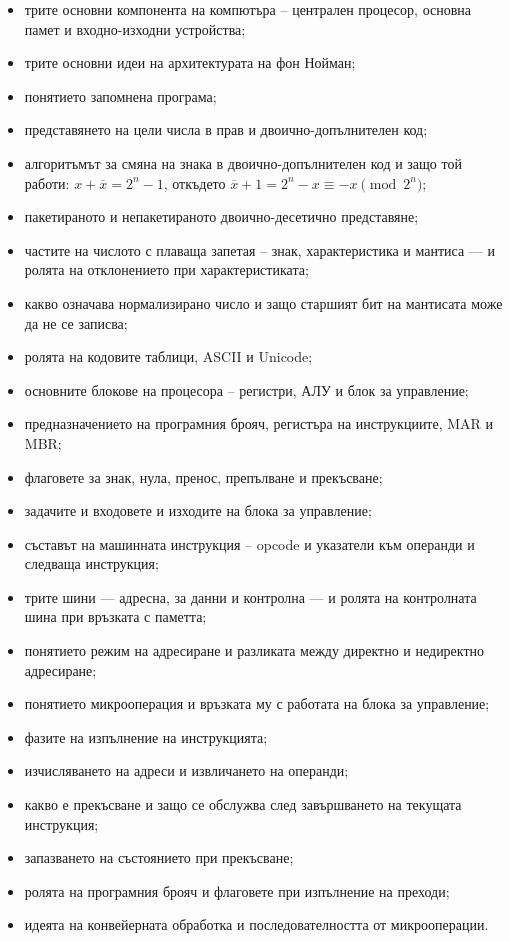 \begin{itemize}
    \item трите основни компонента на компютъра -- централен процесор, основна памет и входно-изходни устройства;
    \item трите основни идеи на архитектурата на фон Нойман;
    \item понятието запомнена програма;
    \item представянето на цели числа в прав и двоично-допълнителен код;
    \item алгоритъмът за смяна на знака в двоично-допълнителен код и защо той работи: $x+\overline{x}=2^n-1$, откъдето $\overline{x}+1=2^n-x\equiv-x \pmod{2^n}$;
    \item пакетираното и непакетираното двоично-десетично представяне;
    \item частите на числото с плаваща запетая -- знак, характеристика и мантиса --- и ролята на отклонението при характеристиката;

    \item какво означава нормализирано число и защо старшият бит на мантисата може да не се записва;
    \item ролята на кодовите таблици, ASCII и Unicode;
    \item основните блокове на процесора -- регистри, АЛУ и блок за управление;
    \item предназначението на програмния брояч, регистъра на инструкциите, MAR и MBR;
    \item флаговете за знак, нула, пренос, препълване и прекъсване;
    \item задачите и входовете и изходите на блока за управление;
    \item съставът на машинната инструкция -- opcode и указатели към операнди и следваща инструкция;
    \item трите шини --- адресна, за данни и контролна --- и ролята на контролната шина при връзката с паметта;

    \item понятието режим на адресиране и разликата между директно и недиректно адресиране;

    \item понятието микрооперация и връзката му с работата на блока за управление;
    \item фазите на изпълнение на инструкцията;
    \item изчисляването на адреси и извличането на операнди;
    \item какво е прекъсване и защо се обслужва след завършването на текущата инструкция;

    \item запазването на състоянието при прекъсване;
    \item ролята на програмния брояч и флаговете при изпълнение на преходи;
    \item идеята на конвейерната обработка и последователността от микрооперации.
\end{itemize}
